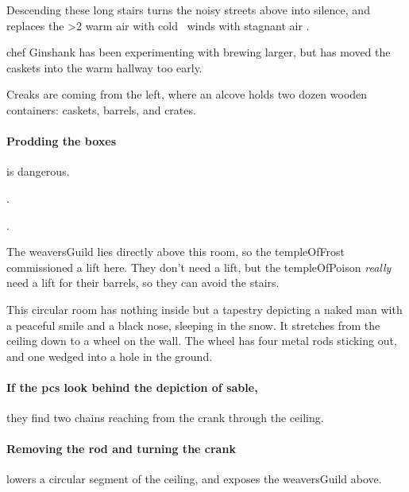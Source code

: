 \begin{multicols}{2}
Descending these long stairs turns the noisy streets above into silence, and replaces the
\ifnum\value{temperature}>2%
  warm air with cold%
\else%
  \showTemperature\ winds with stagnant air%
\fi.

\begin{exampletext}
  \Gls{chef} Ginshank has been experimenting with brewing larger, but has moved the caskets into the warm hallway too early.
\end{exampletext}

\begin{boxtext}
  Creaks are coming from the left, where an alcove holds two dozen wooden containers: caskets, barrels, and crates.
\end{boxtext}

\paragraph{Prodding the boxes}
is dangerous.

.

.


\begin{exampletext}
  The \gls{weaversGuild} lies directly above this room, so the \gls{templeOfFrost} commissioned a lift here.
  They don't need a lift, but the \gls{templeOfPoison} \emph{really} need a lift for their barrels, so they can avoid the stairs.
\end{exampletext}

\begin{boxtext}
  This circular room has nothing inside but a tapestry depicting a naked man with a peaceful smile and a black nose, sleeping in the snow.
  It stretches from the ceiling down to a wheel on the wall.
  The wheel has four metal rods sticking out, and one wedged into a hole in the ground.
\end{boxtext}

\paragraph{If the \glspl{pc} look behind the depiction of \gls{sable},}
they find two chains reaching from the crank through the ceiling.

\paragraph{Removing the rod and turning the crank}
lowers a circular segment of the ceiling, and exposes the \gls{weaversGuild} above.


\end{multicols}
